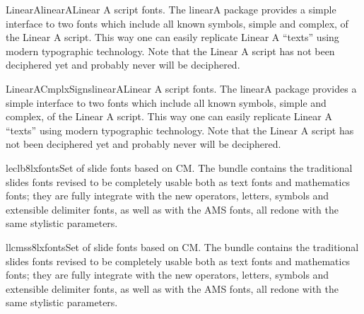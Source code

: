 \documentclass{ddltxtyp}
\begin{document}
\begin{package}{LinearA}{linearA}{Linear A script fonts.}
The linearA package provides a simple interface to two fonts
which include all known symbols, simple and complex, of the
Linear A script. This way one can easily replicate Linear A
``texts'' using modern typographic technology. Note that the
Linear A script has not been deciphered yet and probably never
will be deciphered.
\end{package}
\begin{package}{LinearACmplxSigns}{linearA}{Linear A script fonts.}
The linearA package provides a simple interface to two fonts
which include all known symbols, simple and complex, of the
Linear A script. This way one can easily replicate Linear A
``texts'' using modern typographic technology. Note that the
Linear A script has not been deciphered yet and probably never
will be deciphered.
\end{package}

\begin{package}{leclb8}{lxfonts}{Set of slide fonts based on CM.}
The bundle contains the traditional slides fonts revised to be
completely usable both as text fonts and mathematics fonts;
they are fully integrate with the new operators, letters,
symbols and extensible delimiter fonts, as well as with the AMS
fonts, all redone with the same stylistic parameters.
\end{package}
\begin{package}{llcmss8}{lxfonts}{Set of slide fonts based on CM.}
The bundle contains the traditional slides fonts revised to be
completely usable both as text fonts and mathematics fonts;
they are fully integrate with the new operators, letters,
symbols and extensible delimiter fonts, as well as with the AMS
fonts, all redone with the same stylistic parameters.
\end{package}

\end{document}
